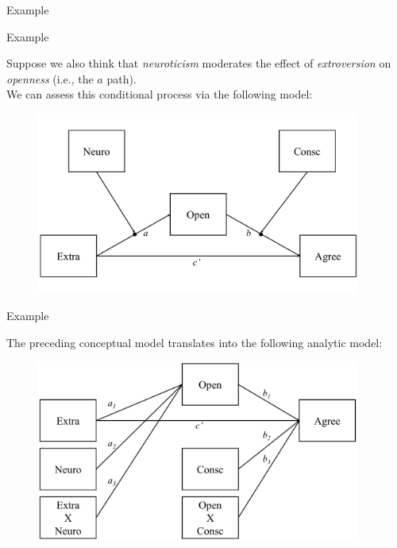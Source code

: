 \documentclass{beamer}
\newcommand{\va}[0]{\vspace{12pt}}
\newcommand{\vb}[0]{\vspace{6pt}}
\begin{document}
\begin{frame}[allowframebreaks]{Example}
  


\pagebreak



\pagebreak



\end{frame}



\begin{frame}{Example}
  
  Suppose we also think that \emph{neuroticism} moderates the effect of
  \emph{extroversion} on \emph{openness} (i.e., the $a$ path).\\
  \va
  We can assess this conditional process via the following model:\\ 
  \vb
  \begin{figure}
    \includegraphics[width=0.95\textwidth]{figures/example3Conceptual.pdf}
  \end{figure}
  
\end{frame}



\begin{frame}{Example}
  
  The preceding conceptual model translates into the following
  analytic model: 
  \vb
  \begin{figure}
    \includegraphics[width=0.95\textwidth]{figures/example3Analytic.pdf}
  \end{figure}
  
\end{frame}
\end{document}
